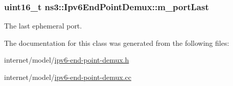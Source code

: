 \subsubsection[{\texorpdfstring{m\+\_\+port\+Last}{m_portLast}}]{\setlength{\rightskip}{0pt plus 5cm}uint16\+\_\+t ns3\+::\+Ipv6\+End\+Point\+Demux\+::m\+\_\+port\+Last\hspace{0.3cm}{\ttfamily [private]}}\hypertarget{classns3_1_1Ipv6EndPointDemux_acc3155c523ddadbe4ac9889bf52d293a}{}\label{classns3_1_1Ipv6EndPointDemux_acc3155c523ddadbe4ac9889bf52d293a}


The last ephemeral port. 



The documentation for this class was generated from the following files\+:\begin{DoxyCompactItemize}
\item 
internet/model/\hyperlink{ipv6-end-point-demux_8h}{ipv6-\/end-\/point-\/demux.\+h}\item 
internet/model/\hyperlink{ipv6-end-point-demux_8cc}{ipv6-\/end-\/point-\/demux.\+cc}\end{DoxyCompactItemize}

